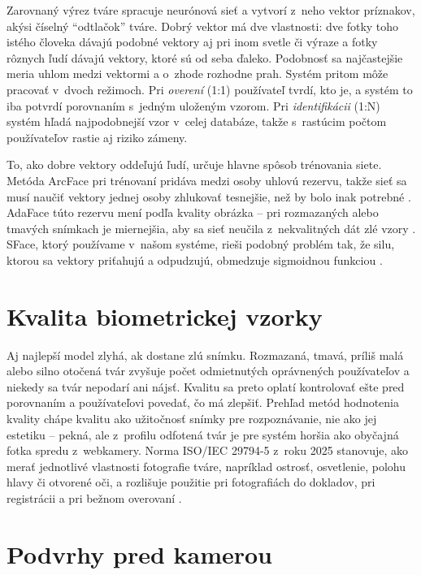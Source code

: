 \documentclass[12pt,a4paper,oneside]{report}
\begin{document}
Zarovnaný výrez tváre spracuje neurónová sieť a vytvorí z~neho vektor príznakov, akýsi
číselný \enquote{odtlačok} tváre. Dobrý vektor má dve vlastnosti: dve fotky toho istého
človeka dávajú podobné vektory aj pri inom svetle či výraze a fotky rôznych ľudí dávajú
vektory, ktoré sú od seba ďaleko. Podobnosť sa najčastejšie meria uhlom medzi vektormi
a o~zhode rozhodne prah. Systém pritom môže pracovať v~dvoch režimoch. Pri
\emph{overení} (1:1) používateľ tvrdí, kto je, a systém to iba potvrdí porovnaním
s~jedným uloženým vzorom. Pri \emph{identifikácii} (1:N) systém hľadá najpodobnejší
vzor v~celej databáze, takže s~rastúcim počtom používateľov rastie aj riziko zámeny.

To, ako dobre vektory oddeľujú ľudí, určuje hlavne spôsob trénovania siete. Metóda
ArcFace pri trénovaní pridáva medzi osoby uhlovú rezervu, takže sieť sa musí naučiť
vektory jednej osoby zhlukovať tesnejšie, než by bolo inak potrebné
\cite{deng2022arcface}. AdaFace túto rezervu mení podľa kvality obrázka -- pri
rozmazaných alebo tmavých snímkach je miernejšia, aby sa sieť neučila z~nekvalitných
dát zlé vzory \cite{kim2022adaface}. SFace, ktorý používame v~našom systéme, rieši
podobný problém tak, že silu, ktorou sa vektory priťahujú a odpudzujú, obmedzuje
sigmoidnou funkciou \cite{zhong2021sface}.

\section{Kvalita biometrickej vzorky}

Aj najlepší model zlyhá, ak dostane zlú snímku. Rozmazaná, tmavá, príliš malá alebo
silno otočená tvár zvyšuje počet odmietnutých oprávnených používateľov a niekedy sa
tvár nepodarí ani nájsť. Kvalitu sa preto oplatí kontrolovať ešte pred porovnaním
a používateľovi povedať, čo má zlepšiť. Prehľad metód hodnotenia kvality
\cite{schlett2022fiqa} chápe kvalitu ako užitočnosť snímky pre rozpoznávanie, nie ako
jej estetiku -- pekná, ale z~profilu odfotená tvár je pre systém horšia ako obyčajná
fotka spredu z~webkamery. Norma ISO/IEC 29794-5 z~roku 2025 stanovuje, ako merať
jednotlivé vlastnosti fotografie tváre, napríklad ostrosť, osvetlenie, polohu hlavy či
otvorené oči, a rozlišuje použitie pri fotografiách do dokladov, pri registrácii a pri
bežnom overovaní \cite{iso29794-5}.

\section{Podvrhy pred kamerou}
\end{document}
